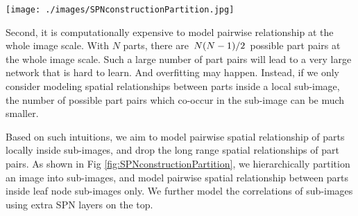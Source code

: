 \documentclass[journal]{IEEEtran}
\begin{document}
\begin{figure*}[htb]
	\begin{center}
		\texttt{[image: ./images/SPNconstructionPartition.jpg]}
	\end{center}
	\caption{An example of our hierarchical spatial SPN. Images I is a sample from action class of \textit{climbing} in Stanford40 dataset \cite{Yao11humanaction__Stanford40}. (a) and (b) show two different partitions of the image, corresponding to two product nodes $ P_1 $ and $ P_2 $  in the SPN. The root sum node $ S $ combine the information together which is represented by its children $ P_1 $ and $ P_2 $. Sub-image $ I_2 $ (shown in (c)) is further partitioned into $ I_{21} $, $ I_{22} $, and $ I_{23} $ corresponding to the product node $ P_{12} $.}
	\label{fig:SPNconstructionPartition}
\end{figure*}





Second, it is computationally expensive to model pairwise relationship at the whole image scale.
With $ N $ parts, there are $\left.N(N-1)\middle/2\right. $ possible part pairs at the whole image scale.
Such a large number of part pairs will lead to a very large network that is hard to learn. And overfitting may happen. Instead, if we only consider modeling spatial relationships between parts inside a local sub-image, the number of possible part pairs which co-occur in the sub-image can be much smaller.





Based on such intuitions, we aim to model pairwise spatial relationship of parts locally inside sub-images, and drop the long range spatial relationships of part pairs. As shown in Fig \ref{fig:SPNconstructionPartition}, we hierarchically partition an image into sub-images, and model pairwise spatial relationship between parts inside leaf node sub-images only.  We further model the correlations of sub-images using extra SPN layers on the top.
\end{document}
